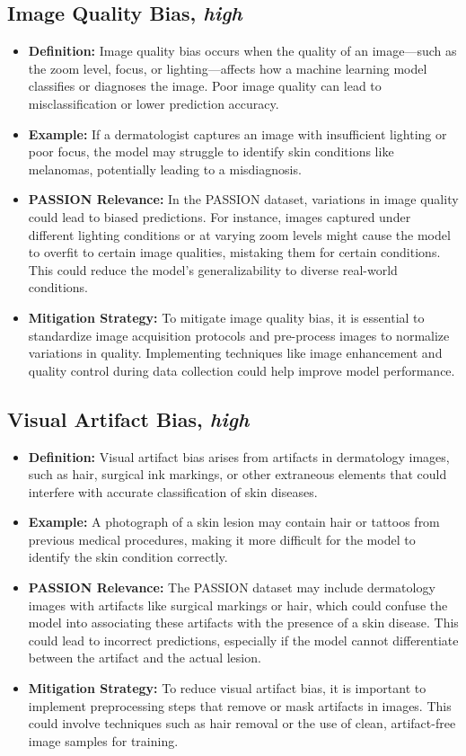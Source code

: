 \begin{refsection}
		\subsection{Image Quality Bias, \textit{high}}
		\begin{itemize}
			\item \textbf{Definition:} Image quality bias occurs when the quality of an image—such as the zoom level, focus, or lighting—affects how a machine learning model classifies or diagnoses the image. Poor image quality can lead to misclassification or lower prediction accuracy.
			\item \textbf{Example:} If a dermatologist captures an image with insufficient lighting or poor focus, the model may struggle to identify skin conditions like melanomas, potentially leading to a misdiagnosis.
			\item \textbf{PASSION Relevance:} In the PASSION dataset, variations in image quality could lead to biased predictions. For instance, images captured under different lighting conditions or at varying zoom levels might cause the model to overfit to certain image qualities, mistaking them for certain conditions. This could reduce the model’s generalizability to diverse real-world conditions.
			\item \textbf{Mitigation Strategy:} To mitigate image quality bias, it is essential to standardize image acquisition protocols and pre-process images to normalize variations in quality. Implementing techniques like image enhancement and quality control during data collection could help improve model performance.
		\end{itemize}
		
		\subsection{Visual Artifact Bias, \textit{high}}
		\begin{itemize}
			\item \textbf{Definition:} Visual artifact bias arises from artifacts in dermatology images, such as hair, surgical ink markings, or other extraneous elements that could interfere with accurate classification of skin diseases.
			\item \textbf{Example:} A photograph of a skin lesion may contain hair or tattoos from previous medical procedures, making it more difficult for the model to identify the skin condition correctly.
			\item \textbf{PASSION Relevance:} The PASSION dataset may include dermatology images with artifacts like surgical markings or hair, which could confuse the model into associating these artifacts with the presence of a skin disease. This could lead to incorrect predictions, especially if the model cannot differentiate between the artifact and the actual lesion.
			\item \textbf{Mitigation Strategy:} To reduce visual artifact bias, it is important to implement preprocessing steps that remove or mask artifacts in images. This could involve techniques such as hair removal or the use of clean, artifact-free image samples for training.
		\end{itemize}
		

\end{refsection}
